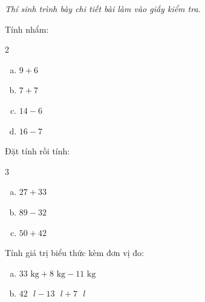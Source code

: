 {\itshape Thí sinh trình bày chi tiết bài làm vào giấy kiểm tra.}

\begin{bt}[1,0 điểm]
Tính nhẩm:
\begin{multicols}{2}
\begin{enumerate}[a)]
  \item $9 + 6$
  \item $7 + 7$
  \item $14 - 6$
  \item $16 - 7$
\end{enumerate}
\end{multicols}
\end{bt}

\begin{bt}[1,5 điểm]
Đặt tính rồi tính:
\begin{multicols}{3}
\begin{enumerate}[a)]
  \item $27 + 33$
  \item $89 - 32$
  \item $50 + 42$
\end{enumerate}
\end{multicols}
\end{bt}

\begin{bt}[1,0 điểm]
Tính giá trị biểu thức kèm đơn vị đo:
\begin{enumerate}[a)]
  \item $33\text{ kg} + 8\text{ kg} - 11\text{ kg}$
  \item $42\text{ }l - 13\text{ }l + 7\text{ }l$
\end{enumerate}
\end{bt}

